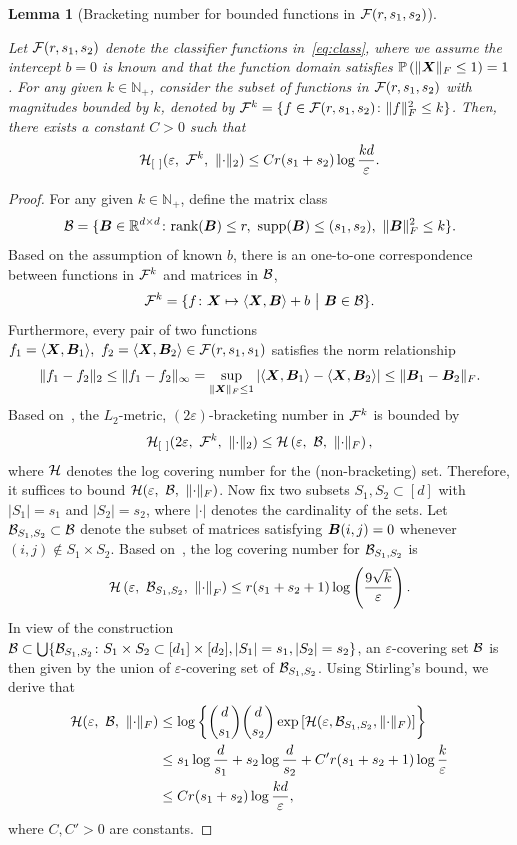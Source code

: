\documentclass[11pt]{article}
\theoremstyle{plain}
\newtheorem{lem}{Lemma}
\theoremstyle{definition}
\begin{document}
\begin{lem}[Bracketing number for bounded functions in $\mathcal{F}(r,s_1,s_2)$]\label{lem:entropy}

Let $\mathcal{F}(r,s_1,s_2)$ denote the classifier functions in~\eqref{eq:class}, where we assume the intercept $b=0$ is known and that the function domain satisfies $\mathbb{P}\left(\lVert\bm X\rVert_F\leq 1\right)=1$. For any given $k\in\mathbb{N}_{+}$, consider the subset of functions in $\mathcal{F}(r,s_1,s_2)$ with magnitudes bounded by $k$, denoted by $\mathcal{F}^k=\{f\in \mathcal{F}(r,s_1,s_2)\colon \lVert f\rVert_F^2\leq k\}$. Then, there exists a constant $C>0$ such that
\[
\tH_{[\ ]}(\varepsilon,\ \tF^k,\ \vnormSize{}{\cdot}) \leq  Cr(s_1+s_2) \log {kd\over \varepsilon }.
\]
\end{lem}
\begin{proof} 
For any given $k\in\mathbb{N}_{+}$, define the matrix class
\[
\tB=\{\mB\in \mathbb{R}^{d\times d}\colon \text{rank}(\mB)\leq r,\ \text{supp}(\mB)\leq (s_1,s_2),\ \FnormSize{}{\mB}^2\leq k\}.
\]
Based on the assumption of known $b$, there is an one-to-one correspondence between functions in $\mathcal{F}^k$ and matrices in $\mathcal{B}$,
\[
\mathcal{F}^k=\{f\colon\bm X\mapsto\langle \bm X,\bm B\rangle+b\ \big| \ \bm B\in \mathcal{B}\}.
\]
Furthermore, every pair of two functions $f_1=\langle\bm X, \bm B_1\rangle,\ f_2=\langle \bm X,\bm B_2\rangle\in\mathcal{F}(r,s_1,s_1)$ satisfies the norm relationship
\[
\lVert f_1-f_2\rVert_2\leq \lVert f_1-f_2\rVert_\infty =\sup_{\lVert\bm X\rVert_F\leq 1}|\langle \bm X,\bm B_1\rangle -\langle \bm X,\bm B_2\rangle  |\leq \lVert\bm B_1-\bm B_2\rVert_F.
\]
Based on~\citet[Theorem 9.23]{kosorok2007introduction}, the $L_2$-metric, $(2\varepsilon)$-bracketing number in $\mathcal{F}^k$ is bounded by
\[
\tH_{[\ ]}(2\varepsilon,\ \tF^k,\ \vnormSize{}{\cdot}) \leq \tH \left(\varepsilon,\ \tB,\ \FnormSize{}{\cdot}\right),
\]
where $\mathcal{H}$ denotes the log covering number for the (non-bracketing) set. Therefore, it suffices to bound $\tH(\varepsilon,\ \tB,\ \FnormSize{}{\cdot})$. Now fix two subsets $S_1,S_2\subset [d]$ with $|S_1|=s_1$ and $|S_2|=s_2$, where $|\cdot|$ denotes the cardinality of the sets. Let $\mathcal{B}_{S_1,S_2}\subset \mathcal{B}$ denote the subset of matrices satisfying $\bm B(i,j)=0$ whenever $(i,j)\notin S_1\times S_2$. Based on~\citet[Lemma 3.1]{candes2011tight}, the log covering number for $\mathcal{B}_{S_1,S_2}$ is
\[
\tH \left(\varepsilon,\ \tB_{S_1,S_2},\ \Fnorm{\cdot}\right)\leq r(s_1+s_2+1)\log\left({9\sqrt{k}\over \varepsilon}\right).
\]
In view of the construction $\mathcal{B}\subset\bigcup\{\mathcal{B}_{S_1,S_2}\colon S_1\times S_2\subset [d_1]\times[d_2], |S_1|=s_1, |S_2|=s_2\}$, an $\varepsilon$-covering set $\mathcal{B}$ is then given by the union of $\varepsilon$-covering set of $\mathcal{B}_{S_1,S_2}$. Using Stirling's bound, we derive that 
\begin{align}
\mathcal{H}(\varepsilon,\ \mathcal{B},\ \lVert\cdot\rVert_F)&\leq \log \left\{{d \choose s_1}{d \choose s_2}\exp\left[\mathcal{H}(\varepsilon,\mathcal{B}_{S_1,S_2},\lVert\cdot\rVert_F)\right]\right\}
\\
&\leq s_1 \log {d\over s_1}+s_2\log {d\over s_2}+C'r(s_1+s_2+1)\log{k\over \varepsilon}\\
& \leq Cr(s_1+s_2)\log{kd\over \varepsilon},
\end{align}
where $C,C'>0$ are constants. 
\end{proof}
\end{document}
